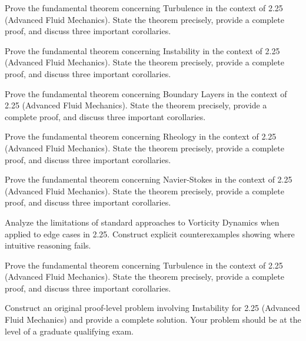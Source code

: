 \documentclass[12pt,a4paper]{exam}
\begin{document}
\begin{questions}
\vspace{0.3cm}

\question[3]
Prove the fundamental theorem concerning Turbulence in the context of 2.25 (Advanced Fluid Mechanics). State the theorem precisely, provide a complete proof, and discuss three important corollaries.

\vspace{0.3cm}

\question[9]
Prove the fundamental theorem concerning Instability in the context of 2.25 (Advanced Fluid Mechanics). State the theorem precisely, provide a complete proof, and discuss three important corollaries.

\vspace{0.3cm}

\question[2]
Prove the fundamental theorem concerning Boundary Layers in the context of 2.25 (Advanced Fluid Mechanics). State the theorem precisely, provide a complete proof, and discuss three important corollaries.

\vspace{0.3cm}

\question[3]
Prove the fundamental theorem concerning Rheology in the context of 2.25 (Advanced Fluid Mechanics). State the theorem precisely, provide a complete proof, and discuss three important corollaries.

\vspace{0.3cm}

\question[3]
Prove the fundamental theorem concerning Navier-Stokes in the context of 2.25 (Advanced Fluid Mechanics). State the theorem precisely, provide a complete proof, and discuss three important corollaries.

\vspace{0.3cm}

\question[5]
Analyze the limitations of standard approaches to Vorticity Dynamics when applied to edge cases in 2.25. Construct explicit counterexamples showing where intuitive reasoning fails.

\vspace{0.3cm}

\question[2]
Prove the fundamental theorem concerning Turbulence in the context of 2.25 (Advanced Fluid Mechanics). State the theorem precisely, provide a complete proof, and discuss three important corollaries.

\vspace{0.3cm}

\question[2]
Construct an original proof-level problem involving Instability for 2.25 (Advanced Fluid Mechanics) and provide a complete solution. Your problem should be at the level of a graduate qualifying exam.


\end{questions}
\end{document}
